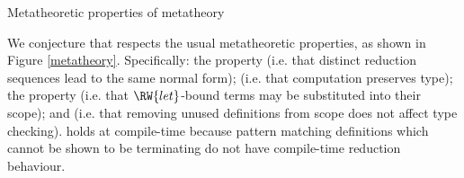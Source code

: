 {Metatheoretic properties of \TT{}}
{metatheory}

We conjecture that \TT{} respects the usual metatheoretic properties, 
as shown in
Figure \ref{metatheory}.  Specifically: the  property
(i.e. that distinct reduction sequences lead to the same normal form);
 (i.e. that computation preserves type); the
 property (i.e. that $\RW{let}$-bound terms may be substituted into
their scope); and  (i.e. that removing unused definitions
from scope does not affect type checking).
 holds at compile-time because pattern matching
definitions which cannot be shown to be terminating do not have compile-time
reduction behaviour.

